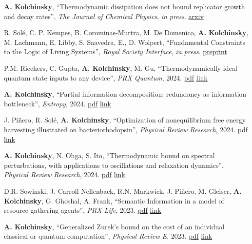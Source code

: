 
\newcommand{\pdflink}[1]{\href{https://artemyk.github.io/assets/pdf/papers/#1.pdf}{pdf}}
\newcommand{\publink}[1]{\href{#1}{link}}

\textbf{A. Kolchinsky}, ``Thermodynamic dissipation does not bound replicator growth and decay rates'', \emph{The Journal of Chemical Physics}, \emph{in press}. \href{http://arxiv.org/abs/2404.01130}{arxiv} %

R. Solé, C. P. Kempes, B. Corominas-Murtra, M. De Domenico, \textbf{A. Kolchinsky}, M. Lachmann, E. Libby, S. Saavedra, E., D. Wolpert, ``Fundamental Constraints to the Logic of Living Systems'', \emph{Royal Society Interface}, \emph{in press}. \href{https://www.preprints.org/manuscript/202406.0891/v1}{preprint}

P.M. Riechers, C. Gupta, \textbf{A. Kolchinsky}, M. Gu, ``Thermodynamically ideal quantum state inputs to any device'', \emph{PRX Quantum}, 2024. \pdflink{Riechers_2024_ThermodynamicallyIdealInputs} \publink{https://journals.aps.org/prxquantum/abstract/10.1103/PRXQuantum.5.030318}

\textbf{A. Kolchinsky}, ``Partial information decomposition: redundancy as information bottleneck'', \emph{Entropy}, 2024. \pdflink{Kolchinsky_2024_PIDasIB} \publink{https://www.mdpi.com/1099-4300/26/7/546}

J. Piñero, R. Solé, \textbf{A. Kolchinsky}, ``Optimization of nonequilibrium free energy harvesting illustrated on bacteriorhodopsin'', \emph{Physical Review Research}, 2024. \pdflink{Pinero_Sole_Kolchinsky_2024_OptimizationOfFreeEnergyHarvesting} \publink{https://journals.aps.org/prresearch/abstract/10.1103/PhysRevResearch.6.013275}

\textbf{A. Kolchinsky}, N. Ohga, S. Ito, ``Thermodynamic bound on spectral perturbations, with applications to oscillations and relaxation dynamics'', \emph{Physical Review Research}, 2024. \pdflink{Kolchinsky_Ohga_Ito_ThermodynamicBoundOnSpectralPerturbations} \publink{https://journals.aps.org/prresearch/pdf/10.1103/PhysRevResearch.6.013082}

D.R. Sowinski, J. Carroll-Nellenback, R.N. Markwick, J. Piñero, M. Gleiser, \textbf{A. Kolchinsky}, G. Ghoshal, A. Frank, ``Semantic Information in a model of resource gathering agents'', \emph{PRX Life}, 2023. \pdflink{Sowinski-SemanticInformationInAModelOfResourceGatheringAgents} \publink{https://journals.aps.org/prxlife/abstract/10.1103/PRXLife.1.023003}

\textbf{A. Kolchinsky}, ``Generalized Zurek's bound on the cost of an individual classical or quantum computation'', \emph{Physical Review E}, 2023. \pdflink{Kolchinsky_2023_GeneralizedZureksBound} \publink{https://journals.aps.org/pre/abstract/10.1103/PhysRevE.108.034101}

